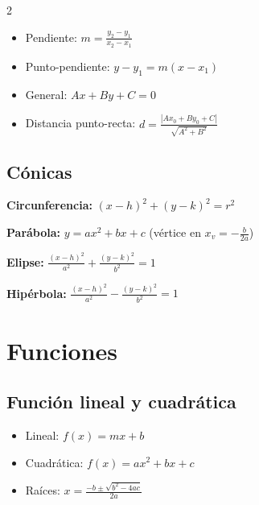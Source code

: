 \documentclass[12pt]{article}
\begin{document}
\begin{multicols}{2}
\begin{itemize}[leftmargin=*]
    \item Pendiente: $m = \frac{y_2-y_1}{x_2-x_1}$
    \item Punto-pendiente: $y-y_1 = m(x-x_1)$
    \item General: $Ax+By+C=0$
    \item Distancia punto-recta: $d = \frac{|Ax_0+By_0+C|}{\sqrt{A^2+B^2}}$
\end{itemize}

\subsection*{Cónicas}

\textbf{Circunferencia:} $(x-h)^2+(y-k)^2 = r^2$


\textbf{Parábola:} $y = ax^2+bx+c$ (vértice en $x_v = -\frac{b}{2a}$)


\textbf{Elipse:} $\frac{(x-h)^2}{a^2}+\frac{(y-k)^2}{b^2}=1$

\textbf{Hipérbola:} $\frac{(x-h)^2}{a^2}-\frac{(y-k)^2}{b^2}=1$

\section*{Funciones}

\subsection*{Función lineal y cuadrática}
\begin{itemize}[leftmargin=*]
    \item Lineal: $f(x)=mx+b$
    \item Cuadrática: $f(x)=ax^2+bx+c$
    \item Raíces: $x=\frac{-b\pm\sqrt{b^2-4ac}}{2a}$
\end{itemize}


\end{multicols}
\end{document}
